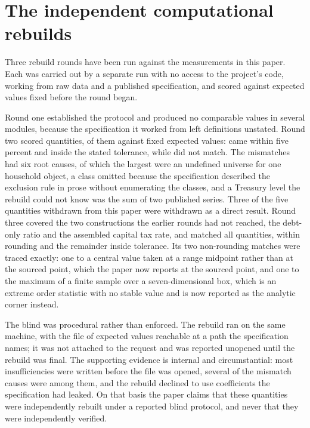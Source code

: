 \section{The independent computational rebuilds}
\label{app:rebuild}

Three rebuild rounds have been run against the measurements in this paper. Each was carried out by
a separate run with no access to the project's code, working from raw data and a published
specification, and scored against expected values fixed before the round began.

Round one established the protocol and produced no comparable values in several modules, because
the specification it worked from left definitions unstated. Round two scored
 quantities,  of them against fixed expected values:
 came within five percent and  inside the stated
tolerance, while  did not match. The mismatches had six root causes, of
which the largest were an undefined universe for one household object, a class omitted because the
specification described the exclusion rule in prose without enumerating the classes, and a
Treasury level the rebuild could not know was the sum of two published series. Three of the five
quantities withdrawn from this paper were withdrawn as a direct result. Round three covered the
two constructions the earlier rounds had not reached, the debt-only ratio and the assembled
capital tax rate, and matched all  quantities,
 within rounding and the remainder inside tolerance. Its two
non-rounding matches were traced exactly: one to a central value taken at a range midpoint rather
than at the sourced point, which the paper now reports at the sourced point, and one to the
maximum of a finite sample over a seven-dimensional box, which is an extreme order statistic with
no stable value and is now reported as the analytic corner instead.

The blind was procedural rather than enforced. The rebuild ran on the same machine, with the file
of expected values reachable at a path the specification names; it was not attached to the request
and was reported unopened until the rebuild was final. The supporting evidence is internal and
circumstantial: most insufficiencies were written before the file was opened, several of the
mismatch causes were among them, and the rebuild declined to use coefficients the specification
had leaked. On that basis the paper claims that these quantities were independently rebuilt under
a reported blind protocol, and never that they were independently verified.
